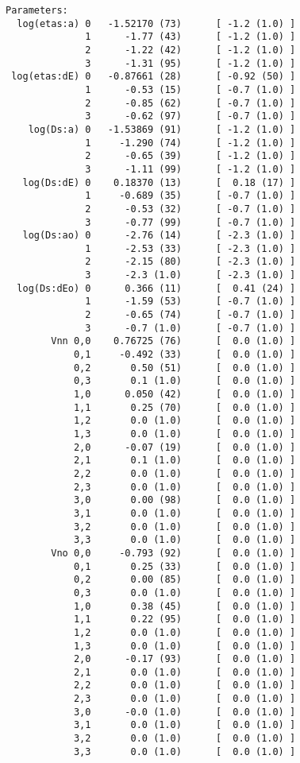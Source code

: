 \documentclass[letterpaper,10pt,english]{sphinxmanual}
\begin{document}
\begin{Verbatim}[commandchars=\\\{\}]
Parameters:
  log(etas:a) 0   -1.52170 (73)      [ -1.2 (1.0) ]  
              1      -1.77 (43)      [ -1.2 (1.0) ]  
              2      -1.22 (42)      [ -1.2 (1.0) ]  
              3      -1.31 (95)      [ -1.2 (1.0) ]  
 log(etas:dE) 0   -0.87661 (28)      [ -0.92 (50) ]  
              1      -0.53 (15)      [ -0.7 (1.0) ]  
              2      -0.85 (62)      [ -0.7 (1.0) ]  
              3      -0.62 (97)      [ -0.7 (1.0) ]  
    log(Ds:a) 0   -1.53869 (91)      [ -1.2 (1.0) ]  
              1     -1.290 (74)      [ -1.2 (1.0) ]  
              2      -0.65 (39)      [ -1.2 (1.0) ]  
              3      -1.11 (99)      [ -1.2 (1.0) ]  
   log(Ds:dE) 0    0.18370 (13)      [  0.18 (17) ]  
              1     -0.689 (35)      [ -0.7 (1.0) ]  
              2      -0.53 (32)      [ -0.7 (1.0) ]  
              3      -0.77 (99)      [ -0.7 (1.0) ]  
   log(Ds:ao) 0      -2.76 (14)      [ -2.3 (1.0) ]  
              1      -2.53 (33)      [ -2.3 (1.0) ]  
              2      -2.15 (80)      [ -2.3 (1.0) ]  
              3      -2.3 (1.0)      [ -2.3 (1.0) ]  
  log(Ds:dEo) 0      0.366 (11)      [  0.41 (24) ]  
              1      -1.59 (53)      [ -0.7 (1.0) ]  
              2      -0.65 (74)      [ -0.7 (1.0) ]  
              3      -0.7 (1.0)      [ -0.7 (1.0) ]  
        Vnn 0,0    0.76725 (76)      [  0.0 (1.0) ]  
            0,1     -0.492 (33)      [  0.0 (1.0) ]  
            0,2       0.50 (51)      [  0.0 (1.0) ]  
            0,3       0.1 (1.0)      [  0.0 (1.0) ]  
            1,0      0.050 (42)      [  0.0 (1.0) ]  
            1,1       0.25 (70)      [  0.0 (1.0) ]  
            1,2       0.0 (1.0)      [  0.0 (1.0) ]  
            1,3       0.0 (1.0)      [  0.0 (1.0) ]  
            2,0      -0.07 (19)      [  0.0 (1.0) ]  
            2,1       0.1 (1.0)      [  0.0 (1.0) ]  
            2,2       0.0 (1.0)      [  0.0 (1.0) ]  
            2,3       0.0 (1.0)      [  0.0 (1.0) ]  
            3,0       0.00 (98)      [  0.0 (1.0) ]  
            3,1       0.0 (1.0)      [  0.0 (1.0) ]  
            3,2       0.0 (1.0)      [  0.0 (1.0) ]  
            3,3       0.0 (1.0)      [  0.0 (1.0) ]  
        Vno 0,0     -0.793 (92)      [  0.0 (1.0) ]  
            0,1       0.25 (33)      [  0.0 (1.0) ]  
            0,2       0.00 (85)      [  0.0 (1.0) ]  
            0,3       0.0 (1.0)      [  0.0 (1.0) ]  
            1,0       0.38 (45)      [  0.0 (1.0) ]  
            1,1       0.22 (95)      [  0.0 (1.0) ]  
            1,2       0.0 (1.0)      [  0.0 (1.0) ]  
            1,3       0.0 (1.0)      [  0.0 (1.0) ]  
            2,0      -0.17 (93)      [  0.0 (1.0) ]  
            2,1       0.0 (1.0)      [  0.0 (1.0) ]  
            2,2       0.0 (1.0)      [  0.0 (1.0) ]  
            2,3       0.0 (1.0)      [  0.0 (1.0) ]  
            3,0      -0.0 (1.0)      [  0.0 (1.0) ]  
            3,1       0.0 (1.0)      [  0.0 (1.0) ]  
            3,2       0.0 (1.0)      [  0.0 (1.0) ]  
            3,3       0.0 (1.0)      [  0.0 (1.0) ]  


\end{Verbatim}
\end{document}
